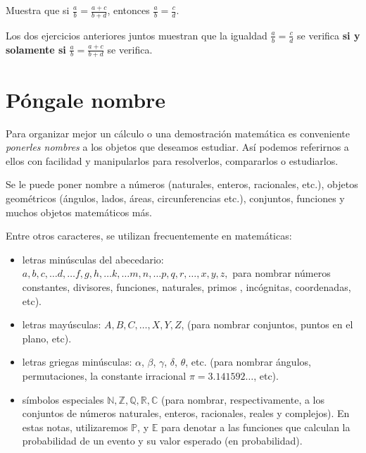 \begin{ejercicio}
Muestra que si $\frac{a}{b}=\frac{a+c}{b+d}$, entonces $\frac{a}{b}=\frac{c}{d}$.
\end{ejercicio}

Los dos ejercicios anteriores juntos muestran que la igualdad $\frac{a}{b}=\frac{c}{d}$ se verifica {\bf si y solamente si} $\frac{a}{b}=\frac{a+c}{b+d}$ se verifica.


\newpage

\section{Póngale nombre}

Para organizar mejor un cálculo o una demostración matemática es conveniente \emph{ponerles nombres} a los objetos que deseamos estudiar. Así podemos referirnos a ellos con facilidad y manipularlos para resolverlos, compararlos o estudiarlos.

Se le puede poner nombre a números (naturales, enteros, racionales, etc.), objetos geométricos (ángulos, lados, áreas, circunferencias etc.), conjuntos, funciones y muchos objetos matemáticos más.

Entre otros caracteres, se utilizan frecuentemente en matemáticas: 
\begin{itemize}
    \item letras minúsculas del abecedario: $a,b,c,\dots d, \dots f,g,h, \dots k, \dots m,n, \dots p,q,r, \dots ,x,y,z,$ 
para nombrar números constantes, divisores, funciones, naturales, primos , incógnitas, coordenadas, etc).
    \item letras mayúsculas: $A,B,C,\dots, X,Y,Z$, (para nombrar conjuntos, puntos en el plano, etc).
    \item letras griegas minúsculas: $\alpha$, $\beta$, $\gamma$, $\delta$, $\theta$, etc. (para nombrar ángulos, permutaciones, la constante irracional $\pi=3.141592\dots $, etc). 
    \item símbolos especiales $\mathbb{N}, \mathbb{Z}, \mathbb{Q}, \mathbb{R}, \mathbb{C}$ (para nombrar, respectivamente, a los conjuntos de números naturales, enteros, racionales, reales y complejos). En estas notas, utilizaremos $\mathbb P$, y $\mathbb E$ para denotar a las funciones que calculan la probabilidad de un evento y su valor esperado (en probabilidad). 
\end{itemize}

